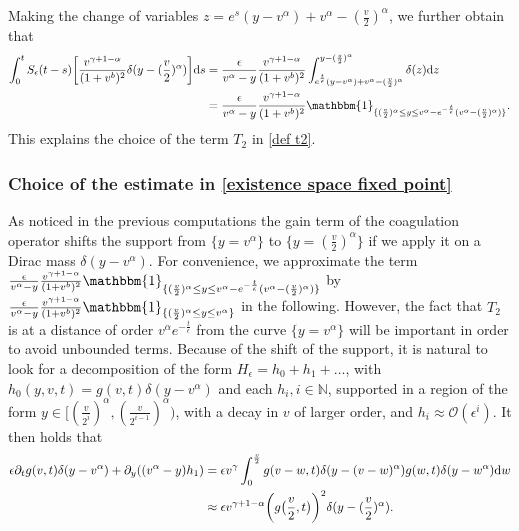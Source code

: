 \documentclass[11pt]{article}
\numberwithin{equation}{section}
\newcommand{\der}{\textup{d}}
\begin{document}
Making the change of variables $z=e^{s}(y-v^{\alpha})+v^{\alpha}-(\frac{v}{2})^{\alpha}$, we further obtain that
\begin{align*}
    \int_{0}^{t}S_{\epsilon}(t-s)\bigg[\frac{v^{\gamma+1-\alpha}}{(1+v^{b})^{2}}\delta(y-(\frac{v}{2})^{\alpha})\bigg]\der s&= \frac{\epsilon}{v^{\alpha}-y} \frac{v^{\gamma+1-\alpha}}{(1+v^{b})^{2}}\int_{e^{\frac{t}{\epsilon}}(y-v^{\alpha})+v^{\alpha}-(\frac{v}{2})^{\alpha}}^{y-(\frac{v}{2})^{\alpha}}\delta(z)\der z\\
    &= \frac{\epsilon}{v^{\alpha}-y} \frac{v^{\gamma+1-\alpha}}{(1+v^{b})^{2}}\mathbbm{1}_{\{(\frac{v}{2})^{\alpha}\leq y \leq v^{\alpha}-e^{-\frac{t}{\epsilon}}(v^{\alpha}-(\frac{v}{2})^{\alpha})\}}.
\end{align*}
    This explains the choice of the term $T_{2}$ in \eqref{def t2}. 
\subsubsection*{Choice of the estimate in \eqref{existence space fixed point}}
 As noticed in the previous computations the gain term of the coagulation operator shifts the support from $\{y=v^{\alpha}\}$ to $\{y=(\frac{v}{2})^{\alpha}\}$ if we apply it on a Dirac mass $\delta(y-v^{\alpha})$. For convenience, we  approximate the term $\frac{\epsilon}{v^{\alpha}-y} \frac{v^{\gamma+1-\alpha}}{(1+v^{b})^{2}}\mathbbm{1}_{\{(\frac{v}{2})^{\alpha}\leq y \leq v^{\alpha}-e^{-\frac{t}{\epsilon}}(v^{\alpha}-(\frac{v}{2})^{\alpha})\}}$ by $\frac{\epsilon}{v^{\alpha}-y} \frac{v^{\gamma+1-\alpha}}{(1+v^{b})^{2}}\mathbbm{1}_{\{(\frac{v}{2})^{\alpha}\leq y \leq v^{\alpha}\}}$ in the following. However, the fact that $T_{2}$ is at a distance of order $v^{\alpha}e^{-\frac{t}{\epsilon}}$ from the curve $\{y=v^{\alpha}\}$ will be important in order to avoid unbounded terms. Because of the shift of the support, it is natural to look for a decomposition of the form $H_{\epsilon}=h_{0}+h_{1}+\ldots$, with $h_{0}(y,v,t)=g(v,t)\delta(y-v^{\alpha})$ and each $h_{i}, i\in\mathbb{N}$, supported in a region of the form $y\in[(\frac{v}{2^{i}})^{\alpha},(\frac{v}{2^{i-1}})^{\alpha})$, with a decay in $v$ of larger order, and $h_{i}\approx\mathcal{O}(\epsilon^i)$. It then holds that
\begin{align*}
    \epsilon\partial_{t}g(v,t)\delta(y-v^{\alpha})+\partial_{y}((v^{\alpha}-y)h_{1})&=\epsilon v^{\gamma}\int_{0}^{\frac{v}{2}}g(v-w,t)\delta(y-(v-w)^{\alpha})g(w,t)\delta(y-w^{\alpha})\der w\\
    &\approx\epsilon v^{\gamma+1-\alpha} \bigg(g\big(\frac{v}{2},t\big)\bigg)^{2}\delta(y-(\frac{v}{2})^{\alpha}).
\end{align*}
\end{document}
